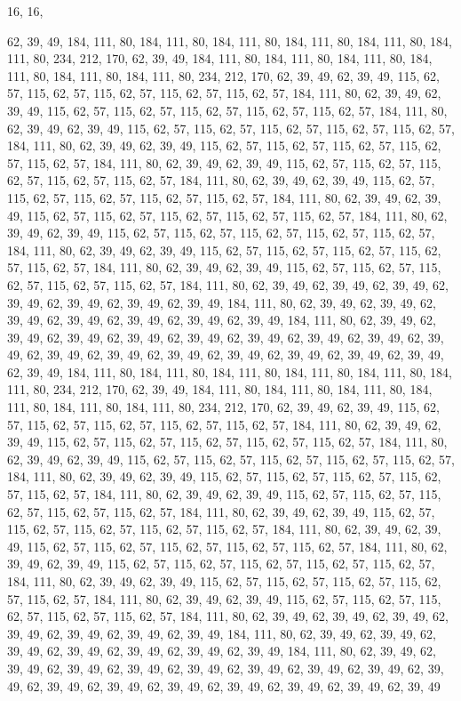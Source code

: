 16, 16,

62, 39, 49, 184, 111, 80, 184, 111, 80, 184, 111, 80, 184, 111, 80, 184,
111, 80, 184, 111, 80, 234, 212, 170, 62, 39, 49, 184, 111, 80, 184, 111,
80, 184, 111, 80, 184, 111, 80, 184, 111, 80, 184, 111, 80, 234, 212, 170,
62, 39, 49, 62, 39, 49, 115, 62, 57, 115, 62, 57, 115, 62, 57, 115,
62, 57, 115, 62, 57, 184, 111, 80, 62, 39, 49, 62, 39, 49, 115, 62,
57, 115, 62, 57, 115, 62, 57, 115, 62, 57, 115, 62, 57, 184, 111, 80,
62, 39, 49, 62, 39, 49, 115, 62, 57, 115, 62, 57, 115, 62, 57, 115,
62, 57, 115, 62, 57, 184, 111, 80, 62, 39, 49, 62, 39, 49, 115, 62,
57, 115, 62, 57, 115, 62, 57, 115, 62, 57, 115, 62, 57, 184, 111, 80,
62, 39, 49, 62, 39, 49, 115, 62, 57, 115, 62, 57, 115, 62, 57, 115,
62, 57, 115, 62, 57, 184, 111, 80, 62, 39, 49, 62, 39, 49, 115, 62,
57, 115, 62, 57, 115, 62, 57, 115, 62, 57, 115, 62, 57, 184, 111, 80,
62, 39, 49, 62, 39, 49, 115, 62, 57, 115, 62, 57, 115, 62, 57, 115,
62, 57, 115, 62, 57, 184, 111, 80, 62, 39, 49, 62, 39, 49, 115, 62,
57, 115, 62, 57, 115, 62, 57, 115, 62, 57, 115, 62, 57, 184, 111, 80,
62, 39, 49, 62, 39, 49, 115, 62, 57, 115, 62, 57, 115, 62, 57, 115,
62, 57, 115, 62, 57, 184, 111, 80, 62, 39, 49, 62, 39, 49, 115, 62,
57, 115, 62, 57, 115, 62, 57, 115, 62, 57, 115, 62, 57, 184, 111, 80,
62, 39, 49, 62, 39, 49, 62, 39, 49, 62, 39, 49, 62, 39, 49, 62,
39, 49, 62, 39, 49, 184, 111, 80, 62, 39, 49, 62, 39, 49, 62, 39,
49, 62, 39, 49, 62, 39, 49, 62, 39, 49, 62, 39, 49, 184, 111, 80,
62, 39, 49, 62, 39, 49, 62, 39, 49, 62, 39, 49, 62, 39, 49, 62,
39, 49, 62, 39, 49, 62, 39, 49, 62, 39, 49, 62, 39, 49, 62, 39,
49, 62, 39, 49, 62, 39, 49, 62, 39, 49, 62, 39, 49, 62, 39, 49,
62, 39, 49, 184, 111, 80, 184, 111, 80, 184, 111, 80, 184, 111, 80, 184,
111, 80, 184, 111, 80, 234, 212, 170, 62, 39, 49, 184, 111, 80, 184, 111,
80, 184, 111, 80, 184, 111, 80, 184, 111, 80, 184, 111, 80, 234, 212, 170,
62, 39, 49, 62, 39, 49, 115, 62, 57, 115, 62, 57, 115, 62, 57, 115,
62, 57, 115, 62, 57, 184, 111, 80, 62, 39, 49, 62, 39, 49, 115, 62,
57, 115, 62, 57, 115, 62, 57, 115, 62, 57, 115, 62, 57, 184, 111, 80,
62, 39, 49, 62, 39, 49, 115, 62, 57, 115, 62, 57, 115, 62, 57, 115,
62, 57, 115, 62, 57, 184, 111, 80, 62, 39, 49, 62, 39, 49, 115, 62,
57, 115, 62, 57, 115, 62, 57, 115, 62, 57, 115, 62, 57, 184, 111, 80,
62, 39, 49, 62, 39, 49, 115, 62, 57, 115, 62, 57, 115, 62, 57, 115,
62, 57, 115, 62, 57, 184, 111, 80, 62, 39, 49, 62, 39, 49, 115, 62,
57, 115, 62, 57, 115, 62, 57, 115, 62, 57, 115, 62, 57, 184, 111, 80,
62, 39, 49, 62, 39, 49, 115, 62, 57, 115, 62, 57, 115, 62, 57, 115,
62, 57, 115, 62, 57, 184, 111, 80, 62, 39, 49, 62, 39, 49, 115, 62,
57, 115, 62, 57, 115, 62, 57, 115, 62, 57, 115, 62, 57, 184, 111, 80,
62, 39, 49, 62, 39, 49, 115, 62, 57, 115, 62, 57, 115, 62, 57, 115,
62, 57, 115, 62, 57, 184, 111, 80, 62, 39, 49, 62, 39, 49, 115, 62,
57, 115, 62, 57, 115, 62, 57, 115, 62, 57, 115, 62, 57, 184, 111, 80,
62, 39, 49, 62, 39, 49, 62, 39, 49, 62, 39, 49, 62, 39, 49, 62,
39, 49, 62, 39, 49, 184, 111, 80, 62, 39, 49, 62, 39, 49, 62, 39,
49, 62, 39, 49, 62, 39, 49, 62, 39, 49, 62, 39, 49, 184, 111, 80,
62, 39, 49, 62, 39, 49, 62, 39, 49, 62, 39, 49, 62, 39, 49, 62,
39, 49, 62, 39, 49, 62, 39, 49, 62, 39, 49, 62, 39, 49, 62, 39,
49, 62, 39, 49, 62, 39, 49, 62, 39, 49, 62, 39, 49, 62, 39, 49
